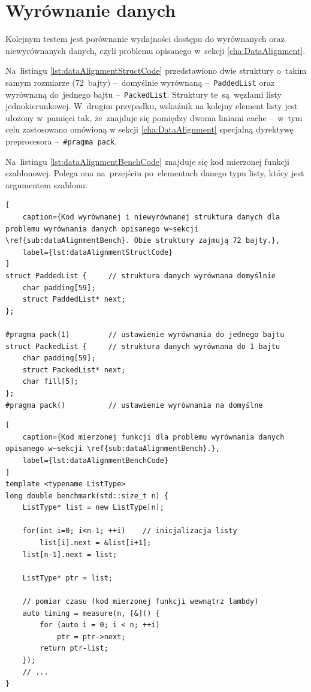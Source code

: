 \clearpage

\section{Wyrównanie danych}
\label{sub:dataAlignmentBench}

Kolejnym testem jest porównanie wydajności dostępu do wyrównanych oraz niewyrównanych danych, czyli problemu opisanego w~sekcji \ref{cha:DataAlignment}.

Na~listingu \ref{lst:dataAlignmentStructCode} przedstawiono dwie struktury o~takim samym rozmiarze (72~bajty) \mbox{--~domyślnie} wyrównaną --~\texttt{PaddedList} oraz wyrównaną do~jednego bajtu --~\texttt{PackedList}. Struktury te~są~węzłami listy jednokierunkowej. W~drugim przypadku, wskaźnik na kolejny element listy jest ułożony w~pamięci tak, że~znajduje się pomiędzy dwoma liniami cache --~w~tym celu zastosowano omówioną w sekcji \ref{cha:DataAlignment} specjalną dyrektywę preprocesora --~\texttt{\#pragma pack}.

Na~listingu \ref{lst:dataAlignmentBenchCode} znajduje się kod mierzonej funkcji szablonowej. Polega ona na~przejściu po~elementach danego typu listy, który jest argumentem szablonu.

\begin{lstlisting}[
    caption={Kod wyrównanej i niewyrównanej struktura danych dla problemu wyrównania danych opisanego w~sekcji \ref{sub:dataAlignmentBench}. Obie struktury zajmują 72 bajty.},
    label={lst:dataAlignmentStructCode}
]
struct PaddedList {		// struktura danych wyrównana domyślnie
    char padding[59];
    struct PaddedList* next;
};

#pragma pack(1)			// ustawienie wyrównania do jednego bajtu
struct PackedList {		// struktura danych wyrównana do 1 bajtu
    char padding[59];
    struct PackedList* next;
    char fill[5];
};
#pragma pack()			// ustawienie wyrównania na domyślne
\end{lstlisting}

\begin{lstlisting}[
    caption={Kod mierzonej funkcji dla problemu wyrównania danych opisanego w~sekcji \ref{sub:dataAlignmentBench}.},
    label={lst:dataAlignmentBenchCode}
]
template <typename ListType>
long double benchmark(std::size_t n) {
    ListType* list = new ListType[n];
    
    for(int i=0; i<n-1; ++i)	// inicjalizacja listy
        list[i].next = &list[i+1];
    list[n-1].next = list;
    
    ListType* ptr = list;
    
    // pomiar czasu (kod mierzonej funkcji wewnątrz lambdy)
    auto timing = measure(n, [&]() {
        for (auto i = 0; i < n; ++i)
            ptr = ptr->next;
        return ptr-list;
    });
    // ...
}
\end{lstlisting}

